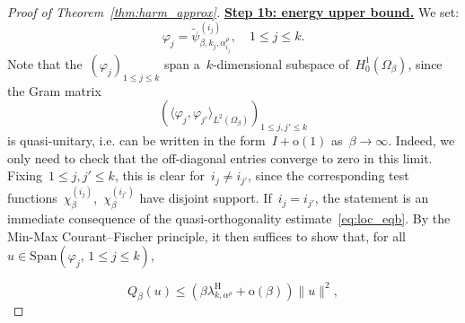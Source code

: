 \documentclass[10pt]{article}
\newcommand{\1}{\mathbbm 1}
\newcommand{\shift}{\rho} %
\renewcommand{\o}{\mathrm{o}}
\begin{document}
\begin{proof}[Proof of Theorem~\ref{thm:harm_approx}]
        {\underline{\bf Step 1b: energy upper bound.}\newline}
        We set:
        \[\varphi_j = \widetilde\psi_{\beta,k_j,\alpha^\shift_{i_j}}^{(i_j)}, \quad 1\leq j\leq k.\]
        Note that the~$(\varphi_j)_{1\leq j \leq k}$ span a~$k$-dimensional subspace of~$H_0^1(\Omega_\beta)$, since the Gram matrix~$$\left(\langle \varphi_j,\varphi_{j'}\rangle_{L^2(\Omega_\beta)}\right)_{1\leq j,j'\leq k}$$ is quasi-unitary, i.e. can be written in the form~$I + \mathrm{o}(1)$ as~$\beta\to\infty$. Indeed, we only need to check that the off-diagonal entries converge to zero in this limit.
        Fixing~$1\leq j,j'\leq k$, this is clear for~$i_j \neq i_{j'}$, since the corresponding test functions~$\chi_\beta^{(i_j)}$,~$\chi_\beta^{(i_{j'})}$ have disjoint support. If~$i_j = i_{j'}$, the statement is an immediate consequence of the quasi-orthogonality estimate~\eqref{eq:loc_eqb}.
        By the Min-Max Courant--Fischer principle, it then suffices to show that, for all~$u\in \mathrm{Span}(\varphi_j,\,1\leq j \leq k)$,
        
        \begin{equation}
            \label{eq:thm1_ub}
            Q_\beta(u) \leq (\beta\lambda_{k,\alpha^\shift}^{\mathrm{H}}+\o(\beta))\|u\|^2,
        \end{equation}


\end{proof}
\end{document}
